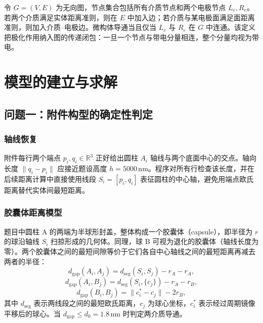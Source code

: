 \documentclass[12pt,a4paper,fontset=windows]{ctexart}
\newcommand{\nm}{\,\mathrm{nm}}
\begin{document}
令 $G=(V,E)$ 为无向图，节点集合包括所有介质节点和两个电极节点 $L_e,R_e$。若两个介质满足实体距离准则，则在 $E$ 中加入边；若介质与某电极面满足面距离准则，则加入介质--电极边。微构体导通当且仅当 $L_e$ 与 $R_e$ 在 $G$ 中连通。该定义把极化作用纳入图的传递闭包：一旦一个节点与带电分量相连，整个分量均视为带电。

\section{模型的建立与求解}

\subsection{问题一：附件构型的确定性判定}

\subsubsection{轴线恢复}
附件每行两个端点 $p_i,q_i\in\mathbb{R}^3$ 正好给出圆柱 $A_i$ 轴线与两个底面中心的交点。轴向长度 $\|q_i-p_i\|$ 应接近题设高度 $h=5000\nm$。程序对所有行检查该长度，并在后续距离计算中直接使用线段 $S_i=[p_i,q_i]$ 表征圆柱的中心轴，避免用端点欧氏距离替代实体间最短距离。

\subsubsection{胶囊体距离模型}
题目中圆柱 A 的两端为半球形封盖，整体构成一个胶囊体（capsule），即半径为 $r$ 的球沿轴线 $S_i$ 扫掠形成的几何体。同理，球 B 可视为退化的胶囊体（轴线长度为零）。两个胶囊体之间的最短间隙等价于它们各自中心轴线之间的最短距离再减去两者的半径：
\begin{equation}
d_{\mathrm{gap}}(A_i,A_j) = d_{\mathrm{seg}}(S_i,S_j) - r_A - r_A,
\label{eq:cap_aa}
\end{equation}
\begin{equation}
d_{\mathrm{gap}}(A_i,B_j) = d_{\mathrm{seg}}(S_i,\{c_j\}) - r_A - r_B,
\label{eq:cap_ab}
\end{equation}
\begin{equation}
d_{\mathrm{gap}}(B_i,B_j) = \|c_i^*-c_j\| - 2r_B,
\label{eq:cap_bb}
\end{equation}
其中 $d_{\mathrm{seg}}$ 表示两线段之间的最短欧氏距离，$c_j$ 为球心坐标，$c_i^*$ 表示经过周期镜像平移后的球心。当 $d_{\mathrm{gap}}\le d_0=1.8\nm$ 时判定两介质导通。
\end{document}
